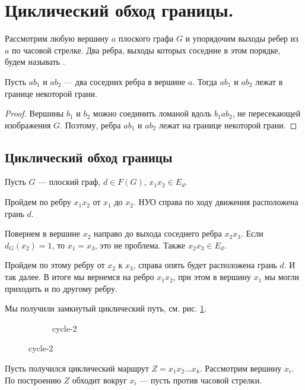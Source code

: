 \section{Циклический обход границы.}
\begin{definition}
    Рассмотрим любую вершину $a$ плоского графа $G$ и упорядочим выходы ребер из $a$ по часовой стрелке. Два ребра, выходы которых соседние в 
	этом порядке, будем называть . 
\end{definition}
\begin{lemma}\label{lm:planar_2}
    Пусть $ab_1$ и $ab_2$ --- два соседних ребра в вершине $a$. Тогда $ab_1$ и $ab_2$ лежат в границе некоторой грани.
\end{lemma}
\begin{proof}
    Вершины $b_1$ и $b_2$ можно соединить ломаной вдоль $b_1ab_2$, не пересекающей изображения $G$. Поэтому, ребра $ab_1$ и $ab_2$ лежат на границе некоторой грани.
\end{proof}
\subsection{Циклический обход границы}
Пусть $G$ --- плоский граф, $d \in F(G)$, $x_1x_2 \in E_d$.

Пройдем по ребру $x_1x_2$ от $x_1$ до $x_2$. НУО справа по ходу движения расположена грань $d$.

Повернем в вершине  $x_2$ направо до выхода соседнего ребра $x_2x_3$. Если $d_G(x_2) = 1$, то $x_1 = x_3$, это не проблема. Также $x_2x_3 \in E_d$.

Пройдем по этому ребру от $x_2$ к $x_3$, справа опять будет расположена грань $d$. И так далее. В итоге мы вернемся на ребро $x_1x_2$, при этом в вершину $x_1$ мы могли приходить и по другому ребру.

Мы получили замкнутый циклический путь, см. рис. \ref{fig:cycle}.
\begin{figure}[ht]
    \centering
	\begin{subfigure}{0.48\textwidth}
		\centering
		\caption{}
		\label{fig:cycle}
	\end{subfigure}
	\hfill
	\begin{subfigure}{0.48\textwidth}
		\centering
		\caption{cycle-2}
		\label{fig:cycle-2}
	\end{subfigure}
\end{figure}

Пусть получился циклический маршрут $Z = x_1 x_2 \ldots x_k$. Рассмотрим вершину $x_i$. По построению $Z$ обходит вокруг $x_i$ --- пусть против часовой стрелки. 

